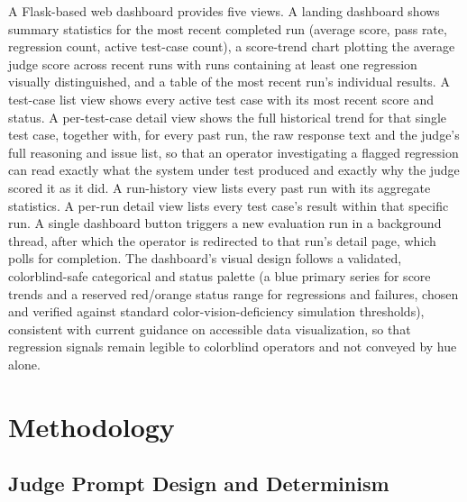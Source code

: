 \documentclass[11pt,a4paper]{article}
\begin{document}
A Flask-based web dashboard provides five views. A landing dashboard
shows summary statistics for the most recent completed run (average
score, pass rate, regression count, active test-case count), a
score-trend chart plotting the average judge score across recent runs
with runs containing at least one regression visually distinguished, and
a table of the most recent run's individual results. A
test-case list view shows every active test case with its most recent
score and status. A per-test-case detail view shows the full historical
trend for that single test case, together with, for every past run, the
raw response text and the judge's full reasoning and
issue list, so that an operator investigating a flagged regression can
read exactly what the system under test produced and exactly why the
judge scored it as it did. A run-history view lists every past run with
its aggregate statistics. A per-run detail view lists every test
case's result within that specific run. A single
dashboard button triggers a new evaluation run in a background thread,
after which the operator is redirected to that run's
detail page, which polls for completion. The dashboard's
visual design follows a validated, colorblind-safe categorical and
status palette (a blue primary series for score trends and a reserved
red/orange status range for regressions and failures, chosen and
verified against standard color-vision-deficiency simulation
thresholds), consistent with current guidance on accessible data
visualization, so that regression signals remain legible to colorblind
operators and not conveyed by hue alone.

\section{Methodology}

\subsection{Judge Prompt Design and Determinism}
\end{document}
